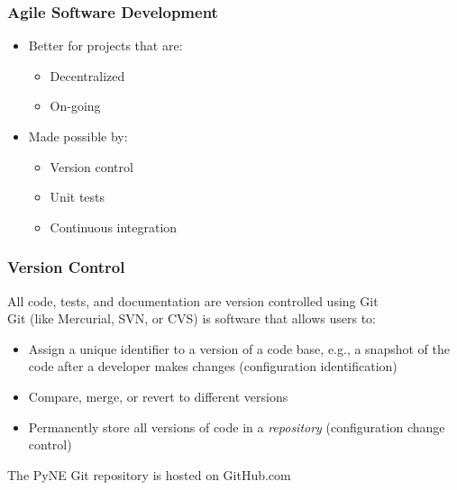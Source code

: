 \documentclass[12pt]{beamer}
\begin{document}
\begin{frame}
\frametitle{Agile Software Development}

\begin{itemize}
\item{Better for projects that are:}
    \begin{itemize}
    \item{Decentralized}
    \item{On-going}
    \end{itemize}
\item{Made possible by:}
    \begin{itemize}
    \item{Version control}
    \item{Unit tests}
    \item{Continuous integration}
    \end{itemize}
\end{itemize}

\end{frame}


\begin{frame}
\frametitle{Version Control}

All code, tests, and documentation are version controlled using Git \cite{git} \\
\vspace{0.3cm}
Git (like Mercurial, SVN, or CVS) is software that allows users to:
\begin{itemize}
\item{Assign a unique identifier to a version of a code base, e.g., a snapshot of 
      the code after a developer makes changes (\alert{configuration identification})}
\item{Compare, merge, or revert to different versions}
\item{Permanently store all versions of code in a \emph{repository} (\alert{configuration change control})}
\end{itemize}
\vspace{0.3cm}
The PyNE Git repository is hosted on GitHub.com

\end{frame}
\end{document}
